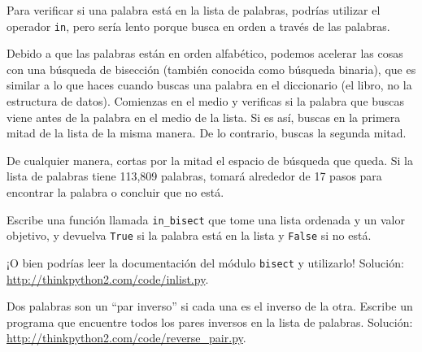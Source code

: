 \documentclass[10pt]{book}
\begin{document}
\begin{exercise}
\label{wordlist1}
\label{bisection}

Para verificar si una palabra está en la lista de palabras, podrías utilizar
el operador {\tt in}, pero sería lento porque busca
en orden a través de las palabras.

Debido a que las palabras están en orden alfabético, podemos acelerar las cosas
con una búsqueda de bisección (también conocida como búsqueda binaria), que es
similar a lo que haces cuando buscas una palabra en el diccionario (el libro, no la estructura de datos).
Comienzas en el medio y verificas si la palabra que buscas
viene antes de la palabra en el medio de la lista.  Si es así,
buscas en la primera mitad de la lista de la misma manera.  De lo contrario, buscas
la segunda mitad.

De cualquier manera, cortas por la mitad el espacio de búsqueda que queda.  Si la
lista de palabras tiene 113,809 palabras, tomará alrededor de 17 pasos
para encontrar la palabra o concluir que no está.

Escribe una función llamada \verb"in_bisect" que tome una lista ordenada
y un valor objetivo, y devuelva {\tt True} si la palabra está
en la lista y {\tt False} si no está.

¡O bien podrías leer la documentación del módulo {\tt bisect}
y utilizarlo!  Solución: \url{http://thinkpython2.com/code/inlist.py}.

\end{exercise}

\begin{exercise}

Dos palabras son un ``par inverso'' si cada una es el inverso de la
otra.  Escribe un programa que encuentre todos los pares inversos en la
lista de palabras.  Solución: \url{http://thinkpython2.com/code/reverse_pair.py}.

\end{exercise}
\end{document}
